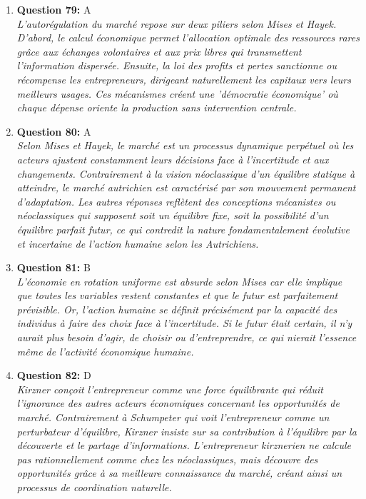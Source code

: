 \documentclass[12pt,a4paper]{article}
\begin{document}
\begin{enumerate}
\item \textbf{Question 79:} A
\\ \textit{L'autorégulation du marché repose sur deux piliers selon Mises et Hayek. D'abord, le calcul économique permet l'allocation optimale des ressources rares grâce aux échanges volontaires et aux prix libres qui transmettent l'information dispersée. Ensuite, la loi des profits et pertes sanctionne ou récompense les entrepreneurs, dirigeant naturellement les capitaux vers leurs meilleurs usages. Ces mécanismes créent une 'démocratie économique' où chaque dépense oriente la production sans intervention centrale.}

\item \textbf{Question 80:} A
\\ \textit{Selon Mises et Hayek, le marché est un processus dynamique perpétuel où les acteurs ajustent constamment leurs décisions face à l'incertitude et aux changements. Contrairement à la vision néoclassique d'un équilibre statique à atteindre, le marché autrichien est caractérisé par son mouvement permanent d'adaptation. Les autres réponses reflètent des conceptions mécanistes ou néoclassiques qui supposent soit un équilibre fixe, soit la possibilité d'un équilibre parfait futur, ce qui contredit la nature fondamentalement évolutive et incertaine de l'action humaine selon les Autrichiens.}

\item \textbf{Question 81:} B
\\ \textit{L'économie en rotation uniforme est absurde selon Mises car elle implique que toutes les variables restent constantes et que le futur est parfaitement prévisible. Or, l'action humaine se définit précisément par la capacité des individus à faire des choix face à l'incertitude. Si le futur était certain, il n'y aurait plus besoin d'agir, de choisir ou d'entreprendre, ce qui nierait l'essence même de l'activité économique humaine.}

\item \textbf{Question 82:} D
\\ \textit{Kirzner conçoit l'entrepreneur comme une force équilibrante qui réduit l'ignorance des autres acteurs économiques concernant les opportunités de marché. Contrairement à Schumpeter qui voit l'entrepreneur comme un perturbateur d'équilibre, Kirzner insiste sur sa contribution à l'équilibre par la découverte et le partage d'informations. L'entrepreneur kirznerien ne calcule pas rationnellement comme chez les néoclassiques, mais découvre des opportunités grâce à sa meilleure connaissance du marché, créant ainsi un processus de coordination naturelle.}


\end{enumerate}
\end{document}
